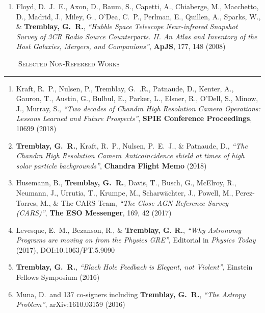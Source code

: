 \documentclass[11pt]{article}
\makeatletter
\def\vhrulefill#1{\leavevmode\leaders\hrule\@height#1\hfill \kern\z@}
\makeatother
\begin{document}
\begin{enumerate}[resume]
\item Floyd, D.~J.~E., Axon, D., Baum, S., Capetti, A., Chiaberge, M.,
Macchetto, D., Madrid, J., Miley, G., O'Dea, C.~P., Perlman, E., Quillen,
A., Sparks, W.,
\& \textbf{Tremblay, G.~R.},  \textit{``Hubble Space Telescope Near-infrared Snapshot Survey of 3CR Radio Source Counterparts. II. An Atlas and Inventory of the Host Galaxies, Mergers, and Companions''}, \textbf{ApJS}, 177,  148 (2008)

\end{enumerate}



\noindent \textsc{ ~~~~Selected Non-Refereed Works} \vhrulefill{0.4pt}

\begin{enumerate}

\item Kraft, R.~P., Nulsen, P., Tremblay, G.~.R., Patnaude, D., Kenter, A.,
Gauron, T., Austin, G., Bulbul, E., Parker, L., Elsner, R., O'Dell, S.,
Minow, J., Murray, S., \textit{``Two decades of Chandra High Resolution Camera
Operations: Lessons Learned and Future Prospects''}, \textbf{SPIE Conference Proceedings},
10699 (2018)

\item \textbf{Tremblay, G.~R.}, Kraft, R.~P., Nulsen, P.~E.~J.,
\& Patnaude, D., \textit{``The Chandra High Resolution Camera Anticoincidence shield at times of high solar particle backgrounds''}, \textbf{Chandra Flight Memo} (2018)


\item Husemann, B., \textbf{Tremblay, G.~R.}, Davis, T., Busch, G., McElroy, R., Neumann, J., Urrutia, T.,
Krumpe, M., Scharw\"{a}chter, J., Powell, M., Perez-Torres, M., \& The CARS Team, \textit{``The Close AGN Reference Survey (CARS)''}, \textbf{The ESO Messenger}, 169, 42 (2017)

\item Levesque, E.~M., Bezanson, R., \& \textbf{Tremblay, G. R.},
\textit{``Why Astronomy Programs are moving on from the Physics GRE''}, Editorial in \textit{Physics Today} (2017), DOI:10.1063/PT.5.9090

\item \textbf{Tremblay, G.~R.}, \textit{``Black Hole Feedback is Elegant, not Violent''}, Einstein Fellows Symposium (2016)

\item Muna, D.~and 137 co-signers including \textbf{Tremblay, G.~R.},
\textit{``The Astropy Problem''}, arXiv:1610.03159 (2016)



\end{enumerate}
\end{document}
